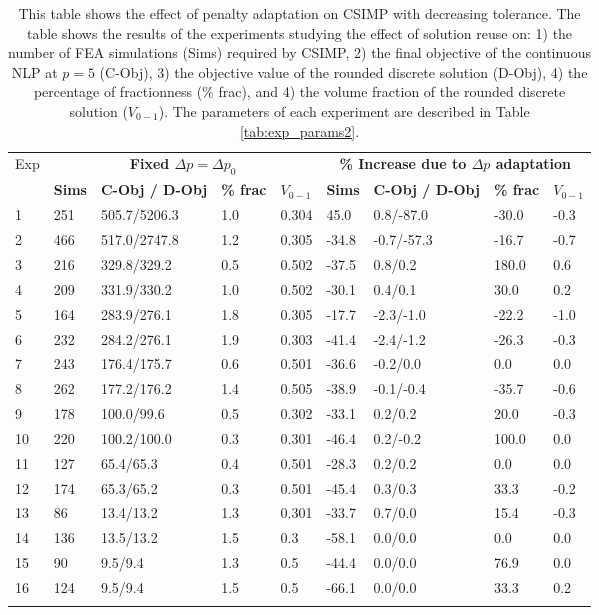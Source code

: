 \begin{table}
\centering
\tabcolsep=0.09cm
\caption{This table shows the effect of penalty adaptation on CSIMP with decreasing tolerance. The table shows the results of the experiments studying the effect of solution reuse on: 1) the number of FEA simulations (Sims) required by CSIMP, 2) the final objective of the continuous NLP at $p = 5$ (C-Obj), 3) the objective value of the rounded discrete solution (D-Obj), 4) the percentage of fractionness (\% frac), and 4) the volume fraction of the rounded discrete solution ($V_{0-1}$). The parameters of each experiment are described in Table \ref{tab:exp_params2}.}
\label{tab:dec_tol_csimp1_reuse}
\begin{tabular}{|l|l|l|l|l||l|l|l|l|}
\hline\noalign{\smallskip}
Exp & \multicolumn{4}{c||}{\textbf{Fixed $\Delta p = \Delta p_0$}} & \multicolumn{4}{c|}{\textbf{\% Increase due to $\Delta p$ adaptation}} \\
\noalign{\smallskip}\hline\noalign{\smallskip}
& \textbf{Sims} & \textbf{C-Obj / D-Obj} & \textbf{\% frac} & \textbf{$V_{0-1}$} & \textbf{Sims} & \textbf{C-Obj / D-Obj} & \textbf{\% frac} & \textbf{$V_{0-1}$}\\
\hline
1 & 251 & 505.7/5206.3 & 1.0 & 0.304 & 45.0 & 0.8/-87.0 & -30.0 & -0.3 \\ 
\hline
2 &  466 & 517.0/2747.8 & 1.2 & 0.305 & -34.8 & -0.7/-57.3 & -16.7 & -0.7 \\ 
\hline
3 &  216 & 329.8/329.2 & 0.5 & 0.502 & -37.5 & 0.8/0.2 & 180.0 & 0.6 \\ 
\hline
4 &  209 & 331.9/330.2 & 1.0 & 0.502 & -30.1 & 0.4/0.1 & 30.0 & 0.2 \\ 
\hline
\hline
5 & 164 & 283.9/276.1 & 1.8 & 0.305 & -17.7 & -2.3/-1.0 & -22.2 & -1.0 \\ 
\hline
6 & 232 & 284.2/276.1 & 1.9 & 0.303 & -41.4 & -2.4/-1.2 & -26.3 & -0.3 \\ 
\hline
7 & 243 & 176.4/175.7 & 0.6 & 0.501 & -36.6 & -0.2/0.0 & 0.0 & 0.0 \\ 
\hline
8 & 262 & 177.2/176.2 & 1.4 & 0.505 & -38.9 & -0.1/-0.4 & -35.7 & -0.6 \\ 
\hline
\hline
9 & 178 & 100.0/99.6 & 0.5 & 0.302 & -33.1 & 0.2/0.2 & 20.0 & -0.3 \\ 
\hline
10 & 220 & 100.2/100.0 & 0.3 & 0.301 & -46.4 & 0.2/-0.2 & 100.0 & 0.0 \\ 
\hline
11 & 127 & 65.4/65.3 & 0.4 & 0.501 & -28.3 & 0.2/0.2 & 0.0 & 0.0 \\ 
\hline
12 & 174 & 65.3/65.2 & 0.3 & 0.501 & -45.4 & 0.3/0.3 & 33.3 & -0.2 \\ 
\hline
\hline
13 & 86 & 13.4/13.2 & 1.3 & 0.301 & -33.7 & 0.7/0.0 & 15.4 & -0.3 \\ 
\hline
14 & 136 & 13.5/13.2 & 1.5 & 0.3 & -58.1 & 0.0/0.0 & 0.0 & 0.0 \\ 
\hline
15 & 90 & 9.5/9.4 & 1.3 & 0.5 & -44.4 & 0.0/0.0 & 76.9 & 0.0 \\ 
\hline
16 & 124 & 9.5/9.4 & 1.5 & 0.5 & -66.1 & 0.0/0.0 & 33.3 & 0.2 \\ 
\hline
\noalign{\smallskip}\hline
\end{tabular}
\end{table}

